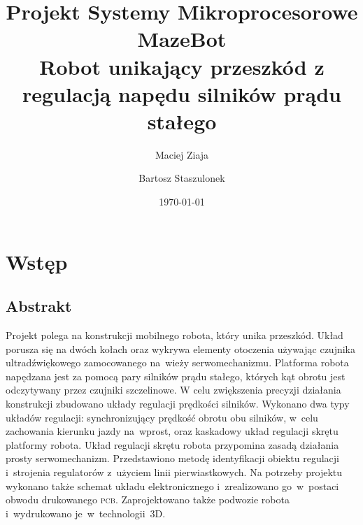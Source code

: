 \documentclass[11pt]{article}
\author{Maciej Ziaja \and Bartosz Staszulonek}
\date{\today}
\begin{document}
\title{
	Projekt Systemy Mikroprocesorowe \\
	\large MazeBot \\
	Robot unikający przeszkód z regulacją napędu silników prądu stałego}

\maketitle

\newpage
{}
\tableofcontents

\section{Wstęp}

\subsection{Abstrakt}
Projekt polega na konstrukcji mobilnego robota, który unika przeszkód.
Układ porusza się na dwóch kołach oraz wykrywa elementy otoczenia używając czujnika ultradźwiękowego zamocowanego na~wieży serwomechanizmu.
Platforma robota napędzana jest za pomocą pary silników prądu stałego, których kąt obrotu jest odczytywany przez czujniki szczelinowe.
W celu zwiększenia precyzji działania konstrukcji zbudowano układy regulacji prędkości silników.
Wykonano dwa typy układów regulacji: synchronizujący prędkość obrotu obu silników, w~celu zachowania kierunku jazdy na~wprost, oraz kaskadowy układ regulacji skrętu platformy robota.
Układ regulacji skrętu robota przypomina zasadą działania prosty serwomechanizm.
Przedstawiono metodę identyfikacji obiektu regulacji i~strojenia regulatorów z~użyciem linii pierwiastkowych.
Na potrzeby projektu wykonano także schemat układu elektronicznego i~zrealizowano go~w~postaci obwodu drukowanego \textsc{pcb}.
Zaprojektowano także podwozie robota i~wydrukowano je~w~technologii~3D.
\end{document}
